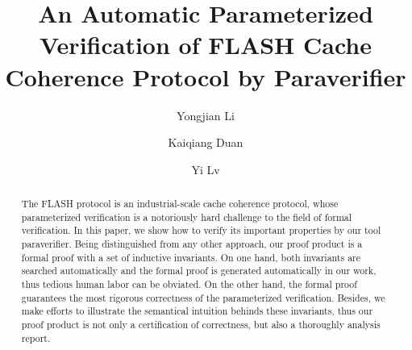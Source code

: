 \documentclass{llncs}
\newcommand{\bedt}[1]{{\color{blue}#1}}
\begin{document}
\title{  An Automatic Parameterized Verification of  FLASH Cache Coherence Protocol by Paraverifier}
\author{Yongjian Li  \and
        Kaiqiang Duan  \and
        Yi Lv  }

\maketitle

\begin{abstract}
The FLASH protocol is an industrial-scale cache coherence protocol, whose parameterized verification is a notoriously hard challenge to the field of formal \bedt{verification}. In this paper, we show how to verify its important properties by our tool {\sf paraverifier}. Being distinguished from any other approach, our proof product is a formal  proof with a set of inductive invariants. %
\bedt{On one hand, both invariants are searched automatically and the formal proof is generated automatically in our work, thus tedious human labor can be obviated. On the other hand, the formal proof guarantees the most rigorous correctness of the parameterized verification. Besides, we make efforts to illustrate the semantical intuition behinds these invariants, thus our proof product is not only a certification of correctness, but also a thoroughly analysis report.}

\end{abstract}
\end{document}
